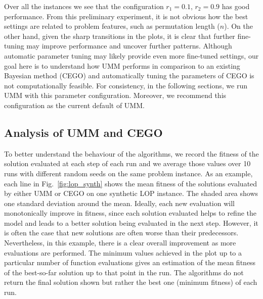 \documentclass[runningheads]{llncs}
\begin{document}
Over all the instances  we
see that the configuration $r_1 =0.1$, $r_2=0.9$ has good
performance. From this
preliminary experiment, it is not obvious how the best settings are related to
problem features, such as permutation length ($n$). On the other hand, given
the sharp transitions in the plots, it is clear that further fine-tuning may
improve performance and uncover further patterns.  Although automatic parameter
tuning may likely provide even more fine-tuned settings, our goal here is to
understand how UMM performs in comparison to an existing Bayesian method (CEGO)
and automatically tuning the parameters of CEGO is not computationally
feasible.  For consistency, in the following sections, we run UMM with this
parameter configuration. Moreover, we recommend this configuration as the
current default of UMM.

\subsection{Analysis of UMM and CEGO}

To better understand the behaviour of the algorithms, we record the fitness of
the solution evaluated at each step of each run and we average those values
over 10 runs with different random seeds on the same problem instance.  As an example, each line in Fig.~\ref{fig:lop_synth} 
shows the mean fitness of the solutions evaluated by either UMM or CEGO on one synthetic LOP
instance. The shaded area shows one standard deviation around the
mean. Ideally, each new evaluation will monotonically improve in fitness, since each solution evaluated helps to refine the model and leads to a
better solution being evaluated in the next step.  However, it is often the case that  
new solutions
are often worse than their predecessors. Nevertheless, in this example, there
is a clear overall improvement as more evaluations are performed. The minimum
values achieved in the plot up to a particular number of function evaluations
gives an estimation of the mean fitness of the best-so-far solution up to that
point in the run. The algorithms do not return the final solution shown but
rather the best one (minimum fitness) of each run.
\end{document}

